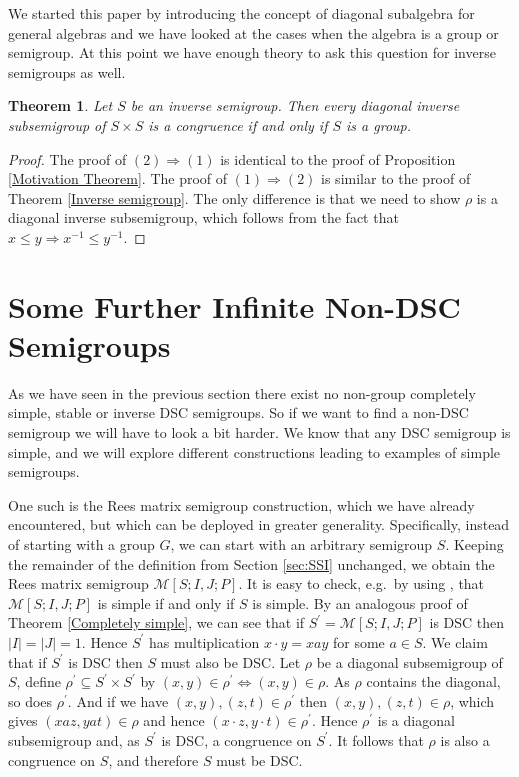 \documentclass[a4paper, 12pt,reqno]{amsart}
\theoremstyle{plain}
\newtheorem{thm}{Theorem}[section]
\theoremstyle{definition}
\theoremstyle{remark}
\begin{document}
We started this paper by introducing the concept of diagonal subalgebra for general algebras and we have looked at the cases when the algebra is a group or semigroup.
At this point we have enough theory to ask this question for inverse semigroups as well.

\begin{thm}\label{Diagonal Inverse Subsemigroup}
    Let $S$ be an inverse semigroup. Then every diagonal inverse subsemigroup of $S \times S$ is a congruence if and only if $S$ is a group.
\end{thm}

\begin{proof}
    The proof of $(2) \Rightarrow (1)$ is identical to the proof of Proposition \ref{Motivation Theorem}. The proof of $(1) \Rightarrow (2)$ is similar to the proof of Theorem \ref{Inverse semigroup}. The only difference is that we need to show $\rho$ is a diagonal inverse subsemigroup, which follows from the fact that $x \leq y \Rightarrow x^{-1} \leq y^{-1}$.
\end{proof}

\section{Some Further Infinite Non-DSC Semigroups}

As we have seen in the previous section there exist no non-group completely simple, stable or inverse DSC semigroups.
So if we want to find a non-DSC semigroup we will have to look a bit harder. 
We know that any DSC semigroup is simple, and we will explore different constructions leading to examples of simple semigroups.


One such is the Rees matrix semigroup construction, which we have already encountered, but which can be deployed in greater generality. Specifically, instead of starting with a group $G$, we can start with an arbitrary semigroup $S$. Keeping the remainder of the definition from Section \ref{sec:SSI} unchanged, we obtain the Rees matrix semigroup
$\mathcal{M}[S;I,J;P]$.
It is easy to check, e.g.\ by using \cite[Corollary 3.1.2]{Ho95}, that $\mathcal{M}[S;I,J;P]$ is simple if and only if $S$ is simple. 
By an analogous proof of Theorem \ref{Completely simple}, we can see that if $S^\prime = \mathcal{M}[S;I,J;P]$ is DSC then $|I| = |J| = 1$.
Hence $S^\prime $ has multiplication $x \cdot y = xay$ for some $a \in S$.
We claim that if $S^\prime$ is DSC then $S$ must also be DSC.
Let $\rho$ be a diagonal subsemigroup of $S$, define $\rho^\prime \subseteq S^\prime \times S^\prime$ by $(x,y) \in \rho^\prime \iff (x,y) \in \rho$. 
As $\rho$ contains the diagonal, so does $\rho^\prime$. 
And if we have $(x,y),(z,t) \in \rho^\prime$ then $(x,y),(z,t) \in \rho$, which gives $(xaz,yat) \in \rho$ and hence $(x\cdot z,y \cdot t) \in \rho^\prime$. 
Hence $\rho^\prime$ is a diagonal subsemigroup and, as $S^\prime$ is DSC, a congruence on $S^\prime$.
It follows that $\rho$ is also a congruence on $S$, and therefore $S$ must be DSC.
\end{document}
